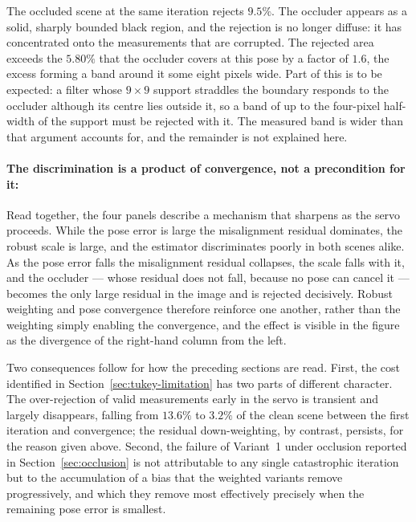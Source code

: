 The occluded scene at the same iteration rejects $9.5\%$. The occluder appears
as a solid, sharply bounded black region, and the rejection is no longer
diffuse: it has concentrated onto the measurements that are corrupted. The
rejected area exceeds the $5.80\%$ that the occluder covers at this pose by a
factor of $1.6$, the excess forming a band around it some eight pixels wide.
Part of this is to be expected: a filter whose $9\times9$ support straddles
the boundary responds to the occluder although its centre lies outside it, so
a band of up to the four-pixel half-width of the support must be rejected with
it. The measured band is wider than that argument accounts for, and the
remainder is not explained here.

\paragraph{The discrimination is a product of convergence, not a precondition
for it:}
Read together, the four panels describe a mechanism that sharpens as the servo
proceeds. While the pose error is large the misalignment residual dominates,
the robust scale is large, and the estimator discriminates poorly in both
scenes alike. As the pose error falls the misalignment residual collapses, the
scale falls with it, and the occluder --- whose residual does not fall,
because no pose can cancel it --- becomes the only large residual in the image
and is rejected decisively. Robust weighting and pose convergence therefore
reinforce one another, rather than the weighting simply enabling the
convergence, and the effect is visible in the figure as the divergence of the
right-hand column from the left.

Two consequences follow for how the preceding sections are read. First, the
cost identified in Section~\ref{sec:tukey-limitation} has two parts of
different character. The over-rejection of valid measurements early in the
servo is transient and largely disappears, falling from $13.6\%$ to $3.2\%$ of
the clean scene between the first iteration and convergence; the residual
down-weighting, by contrast, persists, for the reason given above. Second, the
failure of Variant~1 under occlusion reported in Section~\ref{sec:occlusion}
is not attributable to any single catastrophic iteration but to the
accumulation of a bias that the weighted variants remove progressively, and
which they remove most effectively precisely when the remaining pose error is
smallest.

